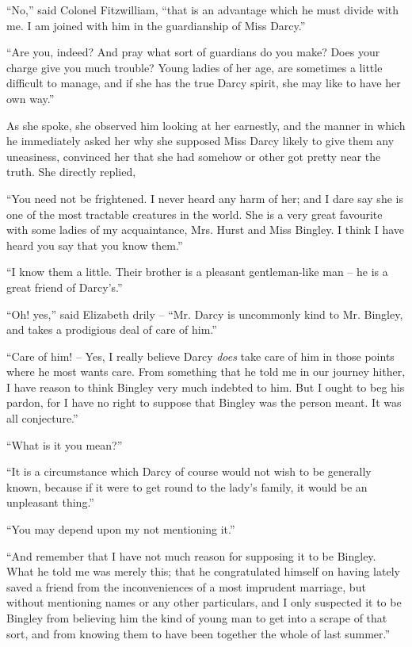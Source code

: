 “No,” said Colonel Fitzwilliam, “that is an advantage
which he must divide with me. I am joined with him in
the guardianship of Miss Darcy.”

“Are you, indeed? And pray what sort of gua\-rdians
do you make? Does your charge give you much trouble?
Young ladies of her age, are sometimes a little difficult
to manage, and if she has the true Darcy spirit, she may
like to have her own way.”

As she spoke, she observed him looking at her earnestly,
and the manner in which he immediately asked her why
she supposed Miss Darcy likely to give them any uneasiness,
convinced her that she had somehow or other got
pretty near the truth. She directly replied,

“You need not be frightened. I never heard any harm
of her; and I dare say she is one of the most tractable
creatures in the world. She is a very great favourite with
some ladies of my acquaintance, Mrs. Hurst and Miss
Bingley. I think I have heard you say that you know
them.”

“I know them a little. Their brother is a pleasant
gentle\-man-like man -- he is a great friend of Darcy’s.”

“Oh! yes,” said Elizabeth drily -- “Mr. Darcy is
uncommonly kind to Mr. Bingley, and takes a prodigious
deal of care of him.”

“Care of him! -- Yes, I really believe Darcy \textit{does} take
care of him in those points where he most wants care.
From something that he told me in our journey hither,
I have reason to think Bingley very much indebted to
him. But I ought to beg his pardon, for I have no right
to suppose that Bingley was the person meant. It was
all conjecture.”

“What is it you mean?”

“It is a circumstance which Darcy of course would
not wish to be generally known, because if it were to
get round to the lady’s family, it would be an unpleasant
thing.”

“You may depend upon my not mentioning it.”

“And remember that I have not much reason for
supposing it to be Bingley. What he told me was merely
this; that he congratulated himself on having lately saved
a friend from the inconveniences of a most imprudent
marriage, but without mentioning names or any other
particulars, and I only suspected it to be Bingley from
believing him the kind of young man to get into a scrape
of that sort, and from knowing them to have been together
the whole of last summer.”

